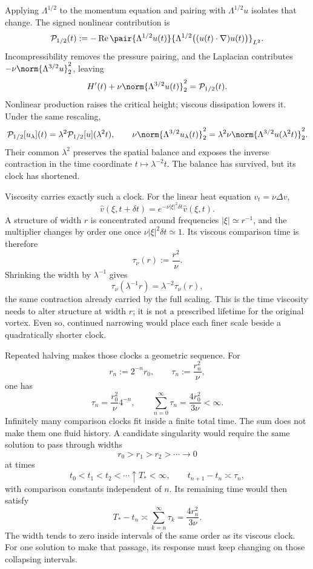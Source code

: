 Applying \(\Lambda^{1/2}\) to the momentum equation and pairing with \(\Lambda^{1/2}u\) isolates that change.
The signed nonlinear contribution is
\[
  \mathcal P_{1/2}(t)
  :=
  -\operatorname{Re}
  \pair
    {\Lambda^{1/2}u(t)}
    {\Lambda^{1/2}\bigl((u(t)\cdot\nabla)u(t)\bigr)}_{L^2}.
\]
Incompressibility removes the pressure pairing, and the Laplacian contributes \(-\nu\norm{\Lambda^{3/2}u}_2^2\), leaving
\[
  H'(t)
  +
  \nu\norm{\Lambda^{3/2}u(t)}_2^2
  =
  \mathcal P_{1/2}(t).
\]
Nonlinear production raises the critical height; viscous dissipation lowers it.
Under the same rescaling,
\[
  \mathcal P_{1/2}[u_\lambda](t)
  =
  \lambda^2\mathcal P_{1/2}[u](\lambda^2t),
  \qquad
  \nu\norm{\Lambda^{3/2}u_\lambda(t)}_2^2
  =
  \lambda^2\nu\norm{\Lambda^{3/2}u(\lambda^2t)}_2^2.
\]
Their common \(\lambda^2\) preserves the spatial balance and exposes the inverse contraction in the time coordinate \(t\mapsto\lambda^{-2}t\).
The balance has survived, but its clock has shortened.


Viscosity carries exactly such a clock.
For the linear heat equation \(v_t=\nu\Delta v\),
\[
  \widehat v(\xi,t+\delta t)
  =
  e^{-\nu|\xi|^2\delta t}\widehat v(\xi,t).
\]
A structure of width \(r\) is concentrated around frequencies \(|\xi|\simeq r^{-1}\), and the multiplier changes by order one once \(\nu|\xi|^2\delta t\simeq1\).
Its viscous comparison time is therefore
\[
  \tau_\nu(r)
  :=
  \frac{r^2}{\nu}.
\]
Shrinking the width by \(\lambda^{-1}\) gives
\[
  \tau_\nu(\lambda^{-1}r)
  =
  \lambda^{-2}\tau_\nu(r),
\]
the same contraction already carried by the full \NavierStokes{} scaling.
This is the time viscosity needs to alter structure at width \(r\); it is not a prescribed lifetime for the original vortex.
Even so, continued narrowing would place each finer scale beside a quadratically shorter clock.


Repeated halving makes those clocks a geometric sequence.
For
\[
  r_n:=2^{-n}r_0,
  \qquad
  \tau_n:=\frac{r_n^2}{\nu},
\]
one has
\[
  \tau_n
  =
  \frac{r_0^2}{\nu}4^{-n},
  \qquad
  \sum_{n=0}^{\infty}\tau_n
  =
  \frac{4r_0^2}{3\nu}
  <
  \infty.
\]
Infinitely many comparison clocks fit inside a finite total time.
The sum does not make them one fluid history.
A candidate singularity would require the same solution to pass through widths
\[
  r_0>r_1>r_2>\cdots\longrightarrow0
\]
at times
\[
  t_0<t_1<t_2<\cdots\uparrow T_*<\infty,
  \qquad
  t_{n+1}-t_n\asymp\tau_n,
\]
with comparison constants independent of \(n\).
Its remaining time would then satisfy
\[
  T_*-t_n
  \asymp
  \sum_{k=n}^{\infty}\tau_k
  =
  \frac{4r_n^2}{3\nu}.
\]
The width tends to zero inside intervals of the same order as its viscous clock.
For one solution to make that passage, its response must keep changing on those collapsing intervals.

